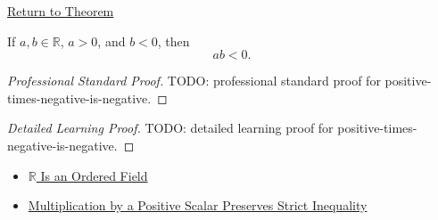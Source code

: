 \newpage
{}
\label{prf:positive-times-negative-is-negative}

\begin{remark*}[Return]
\hyperref[lem:positive-times-negative-is-negative]{Return to Theorem}
\end{remark*}

\begin{lemma*}
If $a,b\in\mathbb{R}$, $a>0$, and $b<0$, then
\[
ab<0.
\]
\end{lemma*}

\begin{proof}[Professional Standard Proof]
\LRAProofBodyStart
TODO: professional standard proof for positive-times-negative-is-negative.
\end{proof}

\begin{proof}[Detailed Learning Proof]
\LRAProofBodyStart
TODO: detailed learning proof for positive-times-negative-is-negative.
\end{proof}

\begin{remark*}
\end{remark*}

\begin{dependencies}
\begin{itemize}
  \item \hyperref[thm:r-is-an-ordered-field]{$\mathbb{R}$ Is an Ordered Field}
  \item \hyperref[thm:ineq-multiply-positive]{Multiplication by a Positive Scalar Preserves Strict Inequality}
\end{itemize}
\end{dependencies}

\clearpage
